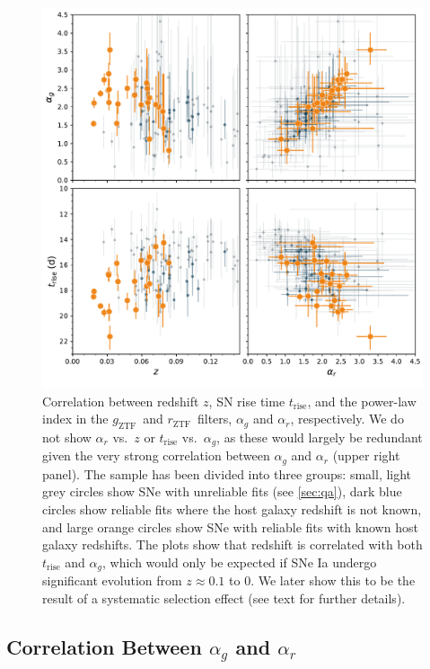 \documentclass[twocolumn]{./aastex63}
\newcommand{\rztf}{$r_\mathrm{ZTF}$}
\newcommand{\gztf}{$g_\mathrm{ZTF}$}
\begin{document}
\begin{figure}
    \centering
    \includegraphics[width=6in]{./figures/param_correlations.pdf}
    \caption{Correlation between redshift $z$, SN rise time
    $t_\mathrm{rise}$, and the power-law index in the \gztf\ and \rztf\
    filters, $\alpha_g$ and $\alpha_r$, respectively. We do not show
    $\alpha_r$ vs.~$z$ or $t_\mathrm{rise}$ vs.~$\alpha_g$, as these would
    largely be redundant given the very strong correlation between $\alpha_g$
    and $\alpha_r$ (upper right panel). The sample has been divided into three
    groups: small, light grey circles show SNe with unreliable fits (see
    \ref{sec:qa}), dark blue circles show reliable fits where the host
    galaxy redshift is not known, and large orange circles show SNe with
    reliable fits with known host galaxy redshifts. The plots show that
    redshift is correlated with both $t_\mathrm{rise}$ and $\alpha_g$, which
    would only be expected if SNe Ia undergo significant evolution from $z
    \approx 0.1$ to $0$. We later show this to be the result of a systematic
    selection effect (see text for further details). }
    \label{fig:model_parameters}
\end{figure}

\subsection{Correlation Between $\alpha_g$ and $\alpha_r$}\label{sec:alpha_correlation}
\end{document}
